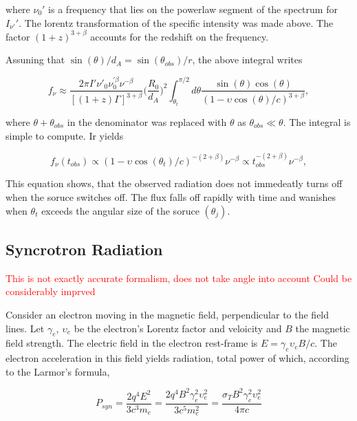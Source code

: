 \documentclass[11pt,a4paper,headinclude=true,DIV=14,BCOR=8mm,chapterprefix,listof=totoc,twoside,openright,abstracton]{scrbook}
\newcommand{\red}[1]{\textcolor{red}{#1}}
\begin{document}
where $\nu_0 '$ is a frequency that lies on the powerlaw segment of the spectrum for $I_{\nu'}'$. The lorentz transformation of the specific intensity was made above. The factor $(1+z)^{3+\beta}$ accounts for the redshift on the frequency. 

Assuning that $\sin(\theta)/d_{A} = \sin(\theta_{obs})/r$, the above integral writes 

\begin{equation}
    f_{\nu} \approx \frac{ 2\pi I' \nu' _0 \nu_{0}^{'\beta}\nu^{-\beta} }{[(1+z)\Gamma]^{3+\beta}} \Big( \frac{R_0}{d_A} \Big)^2 \int_{\theta_t}^{\pi / 2} d\theta \frac{\sin(\theta)\cos(\theta)}{(1-\upsilon\cos(\theta)/c)^{3+\beta}},
\end{equation}

where $\theta+\theta_{obs}$ in the denominator was replaced with $\theta$ as $\theta_{obs}\ll\theta$.
The integral is simple to compute. Ir yields

\begin{equation}
    f_{\nu}(t_{obs}) \propto (1 - \upsilon\cos(\theta_t)/c)^{-(2 + \beta)}\nu^{-\beta} \propto t_{obs}^{-(2+\beta)} \nu^{-\beta},
\end{equation}

This equation shows, that the observed radiation does not immedeatly turns off when the soruce switches off. The flux falls off rapidly with time and wanishes when $\theta_t$ exceeds the angular size of the soruce $(\theta_j)$.


\subsection{Syncrotron Radiation}
\red{This is not exactly accurate formalism, does not take angle into account}
\red{Could be considerably imprved}

Consider an electron moving in the magnetic field, perpendicular to the field lines.
Let $\gamma_e$, $\upsilon_e$ be the electron's Lorentz factor and veloicity and $B$ the magnetic field strength.
The electric field in the electron rest-frame is $E=\gamma_e \upsilon_e B /c$. The electron acceleration in this field yields radiation, total power of which, according to the Larmor's formula, 

\begin{equation}
    P_{syn} = \frac{2q^4E^2}{3c^3m_e}=\frac{2q^4B^2\gamma_e^2\upsilon_e^2}{3c^5m_e^2}=\frac{\sigma_TB^2\gamma_e^2\upsilon_e^2}{4\pi c}
\end{equation}
\end{document}
